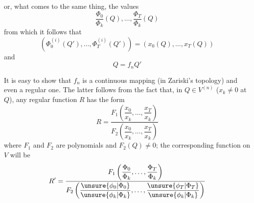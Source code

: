 or, what comes to the same thing, the values
\[
\frac{\Phi_0}{\Phi_k}(Q),\ldots,\frac{\Phi_T}{\Phi_k}(Q)
\]
from which it follows that
\[
(\Phi_0^{(i)}(Q'),\ldots,\Phi_T^{(i)}(Q'))=(x_0(Q),\ldots,x_T(Q))
\]
 and
\[
Q=f_nQ'
\]

It is easy to show that $f_n$ is a continuous mapping (in Zariski's topology) and even a regular one. The latter follows from the fact that, in $Q\in V^{(n)}$ ($x_k\ne0$ at $Q$), any regular function $R$ has the form
\[
R=\frac{F_1\left(\dfrac{x_0}{x_k},\ldots,\dfrac{x_T}{x_k}\right)}{F_2\left(\dfrac{x_0}{x_k},\ldots,\dfrac{x_T}{x_k}\right)}
\]
where $F_1$ and $F_2$ are polynomials and $F_2(Q)\ne0$; the corresponding function on $V$ will be
\[
R'=\frac{F_1\left(\dfrac{\Phi_0}{\Phi_k},\ldots,\dfrac{\Phi_T}{\Phi_k}\right)}{F_2\left(\dfrac{\unsure{\phi_0|\Phi_0}}{\unsure{\phi_k|\Phi_k}},\ldots,\dfrac{\unsure{\phi_T|\Phi_T}}{\unsure{\phi_k|\Phi_k}}\right)}
\]
